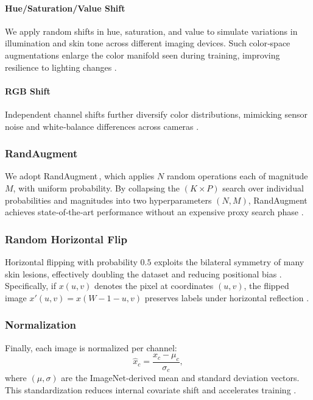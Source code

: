 \paragraph{Hue/Saturation/Value Shift}
We apply random shifts in hue, saturation, and value to simulate variations in illumination and skin tone across different imaging devices. Such color‐space augmentations enlarge the color manifold seen during training, improving resilience to lighting changes \cite{shorten2019survey}.  

\paragraph{RGB Shift}
Independent channel shifts further diversify color distributions, mimicking sensor noise and white‐balance differences across cameras \cite{buslaev2018albumentations}.

\subsubsection{RandAugment}
We adopt RandAugment\,\cite{cubuk2020randaugment}, which applies $N$ random operations each of magnitude $M$, with uniform probability. By collapsing the $(K\times P)$ search over individual probabilities and magnitudes into two hyperparameters $(N,M)$, RandAugment achieves state‐of‐the‐art performance without an expensive proxy search phase \cite{cubuk2020randaugment}.  

\subsubsection{Random Horizontal Flip}
Horizontal flipping with probability $0.5$ exploits the bilateral symmetry of many skin lesions, effectively doubling the dataset and reducing positional bias \cite{wikipediaDataAugmentation}.  Specifically, if $x(u,v)$ denotes the pixel at coordinates $(u,v)$, the flipped image $x'(u,v)=x(W-1-u,v)$ preserves labels under horizontal reflection \cite{simard2003best}.  

\subsubsection{Normalization}
Finally, each image is normalized per channel:
\begin{equation}
\hat{x}_{c} = \frac{x_{c} - \mu_{c}}{\sigma_{c}}, 
\end{equation}
where $(\mu,\sigma)$ are the ImageNet‐derived mean and standard deviation vectors. This standardization reduces internal covariate shift and accelerates training \cite{wikipediaBatchNorm}.  \par

